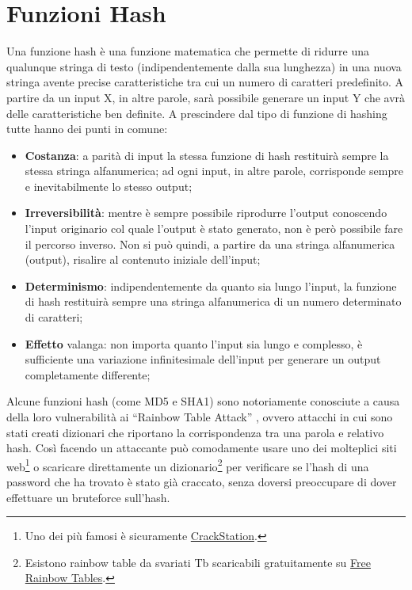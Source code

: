 \section{Funzioni Hash}

Una funzione hash è una funzione matematica che permette di ridurre una
qualunque stringa di
testo (indipendentemente dalla sua lunghezza) in una nuova stringa avente
precise caratteristiche
tra cui un numero di caratteri predefinito. A partire da un input X, in
altre parole, sarà possibile
generare un input Y che avrà delle caratteristiche ben definite.
A prescindere dal tipo di funzione di hashing tutte hanno dei punti in comune:

\begin{itemize}
    \item \textbf{Costanza}: a parità di input la stessa funzione di hash
          restituirà sempre la stessa stringa
          alfanumerica; ad ogni input, in altre parole, corrisponde sempre e
          inevitabilmente lo stesso
          output;
    \item \textbf{Irreversibilità}: mentre è sempre possibile riprodurre
          l'output conoscendo l'input originario
          col quale l'output è stato generato, non è però possibile fare
          il percorso inverso. Non si può
          quindi, a partire da una stringa alfanumerica (output), risalire al contenuto
          iniziale dell'input;
    \item \textbf{Determinismo}: indipendentemente da quanto sia lungo l'input,
          la funzione di hash restituirà
          sempre una stringa alfanumerica di un numero determinato di caratteri;
    \item \textbf{Effetto} valanga: non importa quanto l'input sia lungo e
          complesso, è sufficiente una
          variazione infinitesimale dell'input per generare un output
          completamente differente;
\end{itemize}

Alcune funzioni hash (come MD5 e SHA1) sono notoriamente conosciute a causa della loro vulnerabilità ai ``Rainbow  Table Attack'' , ovvero attacchi in cui sono stati creati dizionari che riportano la corrispondenza tra una parola e  relativo hash. Così facendo un attaccante può comodamente usare uno dei molteplici siti web\footnote{Uno dei più famosi è sicuramente \href{https://crackstation.net/}{CrackStation}.} o scaricare direttamente un dizionario\footnote{Esistono rainbow table da svariati Tb scaricabili gratuitamente su \href{https://freerainbowtables.com/}{Free Rainbow Tables}.} per verificare se l'hash di una password che ha trovato è stato già craccato, senza doversi preoccupare di dover effettuare un bruteforce sull'hash.